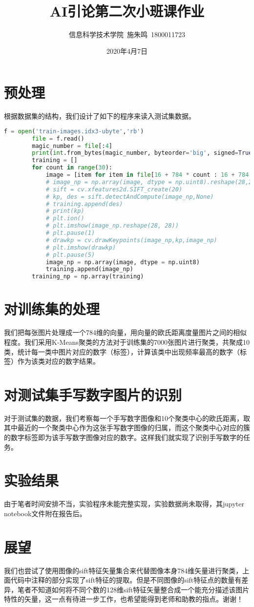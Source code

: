 \documentclass[12pt,AutoFakeBold]{article}
\title{AI引论第二次小班课作业}
\author{信息科学技术学院\ 施朱鸣\ 1800011723}
\date{2020年4月7日}
\begin{document}
    \maketitle
    \section{预处理}
    根据数据集的结构，我们设计了如下的程序来读入测试集数据。
    \begin{lstlisting}[language=python]
        f = open('train-images.idx3-ubyte','rb')
        file = f.read()
        magic_number = file[:4]
        print(int.from_bytes(magic_number, byteorder='big', signed=True))
        training = []
        for count in range(30):
            image = [item for item in file[16 + 784 * count : 16 + 784 * (count + 1)]]
            # image_np = np.array(image, dtype = np.uint8).reshape(28,28,1)
            # sift = cv.xfeatures2d.SIFT_create(20)
            # kp, des = sift.detectAndCompute(image_np,None)
            # training.append(des)
            # print(kp)
            # plt.ion()
            # plt.imshow(image_np.reshape(28, 28))
            # plt.pause(1)
            # drawkp = cv.drawKeypoints(image_np,kp,image_np)
            # plt.imshow(drawkp)
            # plt.pause(5)
            image_np = np.array(image, dtype = np.uint8)
            training.append(image_np)
        training_np = np.array(training)
    \end{lstlisting}
    \section{对训练集的处理}
    我们把每张图片处理成一个784维的向量，用向量的欧氏距离度量图片之间的相似程度。我们采用K-Means聚类的方法对于训练集的7000张图片进行聚类，共聚成10类，统计每一类中图片对应的数字（标签），计算该类中出现频率最高的数字（标签）作为该类对应的数字结果。
    \section{对测试集手写数字图片的识别}
    对于测试集的数据，我们考察每一个手写数字图像和10个聚类中心的欧氏距离，取其中最近的一个聚类中心作为这张手写数字图像的归属，而这个聚类中心对应的簇的数字标签即为该手写数字图像对应的数字。这样我们就实现了识别手写数字的任务。
    \section{实验结果}
    由于笔者时间安排不当，实验程序未能完整实现，实验数据尚未取得，其jupyter notebook文件附在报告后。
    \section{展望}
    我们也尝试了使用图像的sift特征矢量集合来代替图像本身784维矢量进行聚类，上面代码中注释的部分实现了sift特征的提取。但是不同图像的sift特征点的数量有差异，笔者不知道如何将不同个数的128维sift特征矢量整合成一个能充分描述该图片特性的矢量，这一点有待进一步工作，也希望能得到老师和助教的指点。谢谢！
    
\end{document}
